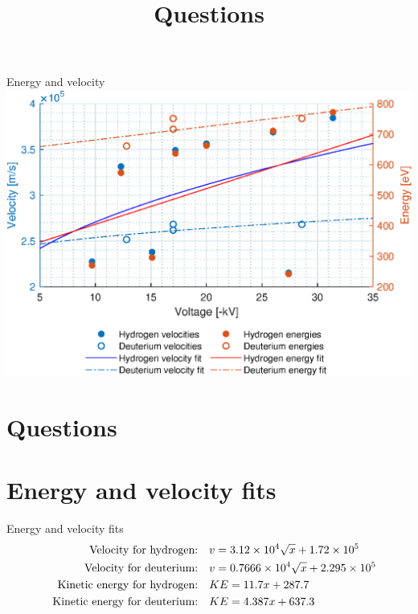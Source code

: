 \documentclass[hyperref={colorlinks=true,urlcolor=blue,linkcolor=.},aspectratio=1610,mathserif]{beamer}
\begin{document}
\begin{frame}{Energy and velocity}
	\centering
	\includegraphics[width=\textwidth]{MatlabFigures/Asign3/KineticVelo.eps}
\end{frame}

\section*{Questions}
\title{Questions}
\subtitle{}
\begin{frame}
	\titlepage
\end{frame}

\appendix
\section{Energy and velocity fits}
\begin{frame}{Energy and velocity fits}
	\begin{align}
		\qq{Velocity for hydrogen:}        & v = 3.12\times10^4 \sqrt{x}+1.72\times10^5   \nonumber \\
		\qq{Velocity for deuterium:}       & v = 0.7666\times10^4\sqrt{x}+2.295\times10^5 \nonumber \\
		\qq{Kinetic energy for hydrogen:}  & KE = 11.7x+287.7                             \nonumber \\
		\qq{Kinetic energy for deuterium:} & KE = 4.387x+637.3 \nonumber
	\end{align}
\end{frame}
\end{document}
